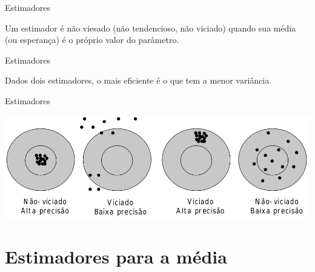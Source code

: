 \documentclass{beamer}
\begin{document}
\begin{frame}{Estimadores}
  \begin{definition}
    Um estimador é \alert{não viesado} (não tendencioso, não viciado)
    quando sua média (ou esperança) é o próprio valor do parâmetro.
  \end{definition}
\end{frame}


\begin{frame}{Estimadores}
  \begin{definition}
    Dados dois estimadores, o mais \alert{eficiente} é o que tem a
    menor variância.
  \end{definition}
\end{frame}

\begin{frame}{Estimadores}
  \begin{center}
    \includegraphics[width=\textwidth]{Inf_I/estimadores}
  \end{center}
\end{frame}

\section{Estimadores para a média}
\end{document}
